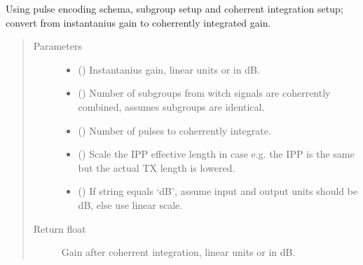 \documentclass[letterpaper,10pt,english]{sphinxmanual}
\begin{document}

\begin{fulllineitems}
\label{\detokenize{modules/antenna:antenna.inst_gain2full_gain}}
Using pulse encoding schema, subgroup setup and coherrent integration setup; convert from instantanius gain to coherrently integrated gain.
\begin{quote}\begin{description}
\item[{Parameters}] \leavevmode\begin{itemize}
\item {} 
 () \textendash{} Instantanius gain, linear units or in dB.

\item {} 
 () \textendash{} Number of subgroups from witch signals are coherrently combined, assumes subgroups are identical.

\item {} 
 () \textendash{} Number of pulses to coherrently integrate.

\item {} 
 () \textendash{} Scale the IPP effective length in case e.g. the IPP is the same but the actual TX length is lowered.

\item {} 
 () \textendash{} If string equals ‘dB’, assume input and output units should be dB, else use linear scale.

\end{itemize}

\item[{Return float}] \leavevmode
Gain after coherrent integration, linear units or in dB.

\end{description}\end{quote}

\end{fulllineitems}
\end{document}
